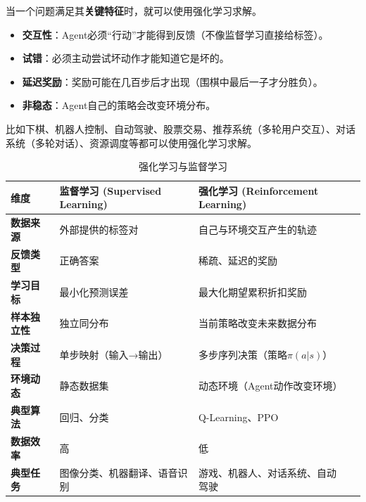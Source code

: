 \documentclass[12pt,a4paper,UTF8]{ctexart}
\begin{document}
当一个问题满足其\textbf{关键特征}时，就可以使用强化学习求解。
\begin{itemize}
    \item \textbf{交互性}：Agent必须“行动”才能得到反馈（不像监督学习直接给标签）。
    \item \textbf{试错}：必须主动尝试坏动作才能知道它是坏的。
    \item \textbf{延迟奖励}：奖励可能在几百步后才出现（围棋中最后一子才分胜负）。
    \item \textbf{非稳态}：Agent自己的策略会改变环境分布。
\end{itemize}
比如下棋、机器人控制、自动驾驶、股票交易、推荐系统（多轮用户交互）、对话系统（多轮对话）、资源调度等都可以使用强化学习求解。
\begin{table}[htbp]
\centering
\begin{tabular}{p{3.5cm}p{5cm}p{5cm}c}
\toprule
维度 & 监督学习 (Supervised Learning) & 强化学习 (Reinforcement Learning)  \\
\midrule
\textbf{数据来源} & 外部提供的标签对 & 自己与环境交互产生的轨迹 \\
\textbf{反馈类型} &正确答案 & 稀疏、延迟的奖励 \\
\textbf{学习目标} & 最小化预测误差 & 最大化期望累积折扣奖励 \\
\textbf{样本独立性} & 独立同分布 & 当前策略改变未来数据分布\\
\textbf{决策过程} & 单步映射（输入→输出） & 多步序列决策（策略\(\pi(a|s)\)）\\
\textbf{环境动态} & 静态数据集 & 动态环境（Agent动作改变环境）  \\
\textbf{典型算法} & 回归、分类 & Q-Learning、PPO  \\
\textbf{数据效率} & 高 & 低  \\
\textbf{典型任务} & 图像分类、机器翻译、语音识别 & 游戏、机器人、对话系统、自动驾驶  \\
\bottomrule
\end{tabular}
\caption{强化学习与监督学习}
\end{table}
\end{document}

